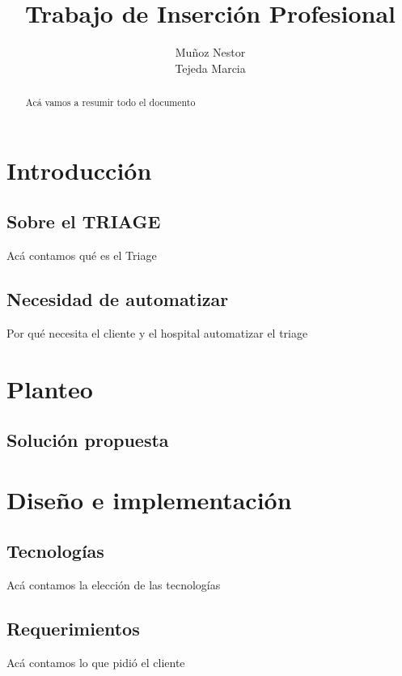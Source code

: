 \documentclass[a4paper,10pt]{article}
\title{Trabajo de Inserción Profesional}
\author{Muñoz Nestor \\ Tejeda Marcia}
\begin{document}
\maketitle
\newpage 
\begin{abstract}
Acá vamos a resumir todo el documento
\end{abstract}


\newpage 
\tableofcontents


\newpage 
\section{Introducción}
\subsection{Sobre el TRIAGE}
Acá contamos qué es el Triage
\subsection{Necesidad de automatizar}
Por qué necesita el cliente y el hospital automatizar el triage

\newpage 
\section{Planteo}
\subsection{Solución propuesta}


\newpage 
\section{Diseño e implementación}
\subsection{Tecnologías}
Acá contamos la elección de las tecnologías

\subsection{Requerimientos}
Acá contamos lo que pidió el cliente

\newpage 

\end{document}
